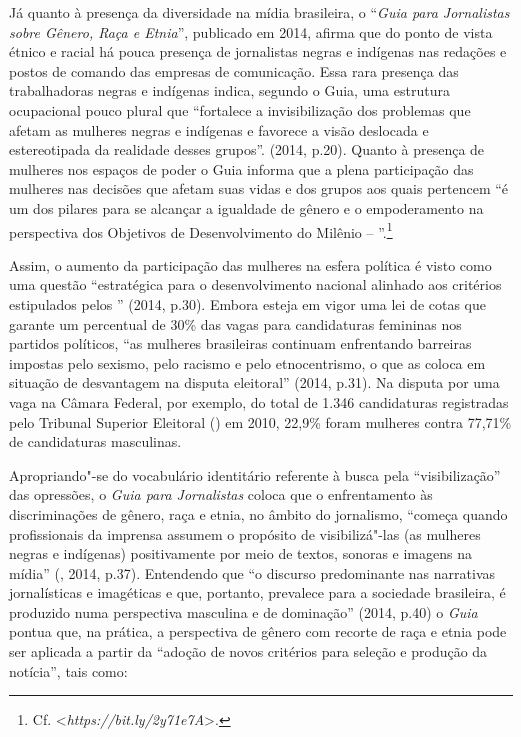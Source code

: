 Já quanto à presença da diversidade na mídia brasileira, o ``\emph{Guia
para Jornalistas sobre Gênero, Raça e Etnia}'', publicado em 2014,
afirma que do ponto de vista étnico e racial há pouca presença de
jornalistas negras e indígenas nas redações e postos de comando das
empresas de comunicação. Essa rara presença das trabalhadoras negras e
indígenas indica, segundo o Guia, uma estrutura ocupacional pouco plural
que ``fortalece a invisibilização dos problemas que afetam as mulheres
negras e indígenas e favorece a visão deslocada e estereotipada da
realidade desses grupos''. (2014, p.20). Quanto à presença de mulheres
nos espaços de poder o Guia informa que a plena participação das
mulheres nas decisões que afetam suas vidas e dos grupos aos quais
pertencem ``é um dos pilares para se alcançar a igualdade de gênero e o
empoderamento na perspectiva dos Objetivos de Desenvolvimento do Milênio
-- ''.\footnote{Cf. \textless{}\emph{https://bit.ly/2y71e7A}\textgreater{}.}

Assim, o aumento da participação das mulheres na esfera política é visto
como uma questão ``estratégica para o desenvolvimento nacional alinhado
aos critérios estipulados pelos '' (2014, p.30). Embora esteja em
vigor uma lei de cotas que garante um percentual de 30\% das vagas para
candidaturas femininas nos partidos políticos, ``as mulheres brasileiras
continuam enfrentando barreiras impostas pelo sexismo, pelo racismo e
pelo etnocentrismo, o que as coloca em situação de desvantagem na
disputa eleitoral'' (2014, p.31). Na disputa por uma vaga na Câmara
Federal, por exemplo, do total de 1.346 candidaturas registradas pelo
Tribunal Superior Eleitoral () em 2010, 22,9\% foram mulheres contra
77,71\% de candidaturas masculinas.

Apropriando"-se do vocabulário identitário referente à busca pela
``visibilização'' das opressões, o \emph{Guia para Jornalistas} coloca
que o enfrentamento às discriminações de gênero, raça e etnia, no âmbito
do jornalismo, ``começa quando profissionais da imprensa assumem o
propósito de visibilizá"-las (as mulheres negras e indígenas)
positivamente por meio de textos, sonoras e imagens na mídia'' (,
2014, p.37). Entendendo que ``o discurso predominante nas narrativas
jornalísticas e imagéticas e que, portanto, prevalece para a sociedade
brasileira, é produzido numa perspectiva masculina e de dominação''
(2014, p.40) o \emph{Guia} pontua que, na prática, a perspectiva de
gênero com recorte de raça e etnia pode ser aplicada a partir da
``adoção de novos critérios para seleção e produção da notícia'', tais
como:


